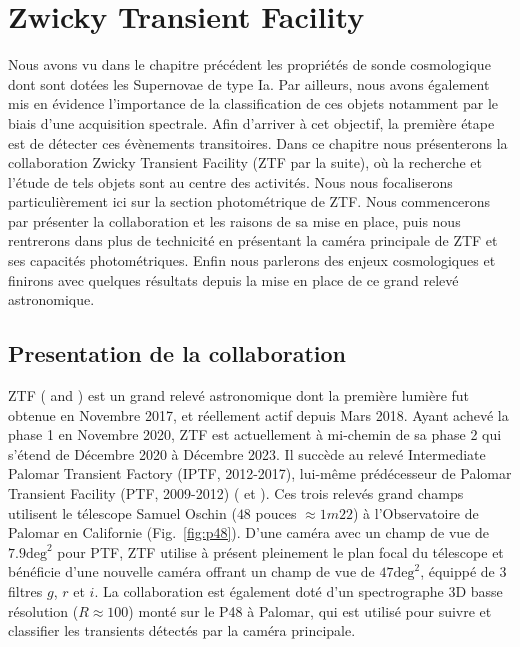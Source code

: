 \documentclass[../main/main.tex]{subfiles}
\begin{document}
\setcounter{chapter}{1}
\chapter{Zwicky Transient Facility}\label{ch:ztf}

\minitoc
\vspace{2cm}
Nous avons vu dans le chapitre précédent les propriétés
de sonde
cosmologique dont sont dotées les Supernovae de type Ia. Par
ailleurs, nous avons également mis en évidence l'importance de la
classification de ces objets notamment par le biais d'une acquisition
spectrale. Afin d'arriver à cet objectif, la première étape est de
détecter ces évènements transitoires. Dans ce chapitre nous présenterons
la collaboration Zwicky Transient Facility (ZTF par la suite), où la recherche et
l'étude de tels objets sont au centre des activités. Nous nous
focaliserons particulièrement ici sur la section photométrique de
ZTF. Nous commencerons par présenter la collaboration et les raisons de
sa mise en place, puis nous rentrerons dans plus de technicité en
présentant la caméra principale de ZTF et ses capacités
photométriques. Enfin nous parlerons des enjeux cosmologiques et
finirons avec quelques résultats depuis la mise en place de ce grand
relevé astronomique.
\newpage
\section{Presentation de la collaboration}
\label{sec:ztfcollab}

ZTF ( \citet{GrahamZTF2019} and \citet{BellmZTF2019}) est un grand relevé astronomique dont la première lumière fut
obtenue en Novembre 2017, et réellement actif depuis Mars
2018. Ayant achevé la phase 1 en Novembre 2020, ZTF est actuellement à
mi-chemin de sa phase 2 qui s'étend de Décembre 2020 à Décembre 2023. Il
succède au relevé Intermediate Palomar Transient Factory (IPTF, 2012-2017),
lui-même prédécesseur de Palomar Transient Facility (PTF, 2009-2012)
(\citet{RauPTF2009} et \citet{LawPTF2009}). Ces trois relevés grand
champs utilisent le télescope Samuel
Oschin ($48$ pouces $\approx 1m22$) à l'Observatoire de Palomar en
Californie (Fig.~\ref{fig:p48}). D'une caméra avec un champ de vue de $7.9 \text{deg}^{2}$
pour PTF, ZTF utilise à présent pleinement le plan focal du télescope et
bénéficie d'une nouvelle caméra offrant un champ de vue de $47
\text{deg}^{2}$, équippé de 3 filtres $g$, $r$ et $i$. La collaboration est également doté d'un spectrographe
3D basse résolution ($R\approx100$) monté sur le P48 à Palomar, qui est
utilisé pour suivre et classifier les transients détectés par la caméra principale.
\end{document}
